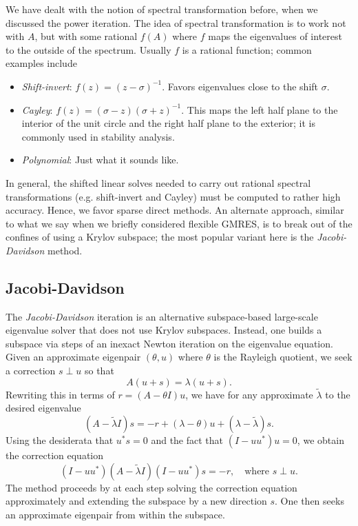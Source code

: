 \documentclass[12pt, leqno]{article} %
\begin{document}
We have dealt with the notion of spectral transformation before,
when we discussed the power iteration.  The idea of spectral
transformation is to work not with $A$, but with some rational
$f(A)$ where $f$ maps the eigenvalues of interest to the outside
of the spectrum.  Usually $f$ is a rational function; common
examples include
\begin{itemize}
\item {\em Shift-invert}: $f(z) = (z-\sigma)^{-1}$.  Favors
  eigenvalues close to the shift $\sigma$.
\item {\em Cayley}: $f(z) = (\sigma-z) (\sigma +z)^{-1}$.  This maps
  the left half plane to the interior of the unit circle and the
  right half plane to the exterior; it is commonly used in stability
  analysis.
\item {\em Polynomial}: Just what it sounds like.
\end{itemize}
In general, the shifted linear solves needed to carry out rational spectral
transformations (e.g. shift-invert and Cayley) must be computed to
rather high accuracy.  Hence, we favor sparse direct methods.  An alternate
approach, similar to what we say when we briefly considered flexible GMRES,
is to break out of the confines of using a Krylov subspace; the most
popular variant here is the {\em Jacobi-Davidson} method.

\subsection{Jacobi-Davidson}

The {\em Jacobi-Davidson} iteration is an alternative subspace-based
large-scale eigenvalue solver that does not use Krylov subspaces.
Instead, one builds a subspace via steps of an inexact Newton iteration
on the eigenvalue equation.  Given an approximate eigenpair $(\theta,u)$
where $\theta$ is the Rayleigh quotient, we seek a correction $s \perp u$
so that
\[
  A(u+s) = \lambda (u+s).
\]
Rewriting this in terms of $r = (A-\theta I) u$, we have for any
approximate $\tilde{\lambda}$ to the desired eigenvalue
\[
  (A-\tilde{\lambda} I) s = -r + (\lambda-\theta) u + (\lambda-\tilde{\lambda}) s.
\]
Using the desiderata that $u^* s = 0$ and the fact that $(I-uu^*) u = 0$,
we obtain the correction equation
\[
  (I-uu^*) (A-\tilde{\lambda} I)(I-uu^*) s = -r, \quad \mbox{where } s \perp u.
\]
The method proceeds by at each step solving the correction equation
approximately and extending the subspace by a new direction $s$.
One then seeks an approximate eigenpair from within the subspace.
\end{document}
